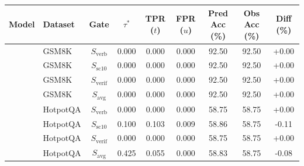 \begin{tabular}{llccccccc}
\toprule
Model & Dataset & Gate & $\tau^*$ & TPR ($t$) & FPR ($u$) & Pred Acc (\%) & Obs Acc (\%) & Diff (\%) \\
\midrule
\modelA{} & GSM8K & $S_{\text{verb}}$ & 0.000 & 0.000 & 0.000 & 92.50 & 92.50 & +0.00 \\
\modelA{} & GSM8K & $S_{\text{sc10}}$ & 0.000 & 0.000 & 0.000 & 92.50 & 92.50 & +0.00 \\
\modelA{} & GSM8K & $S_{\text{verif}}$ & 0.000 & 0.000 & 0.000 & 92.50 & 92.50 & +0.00 \\
\modelA{} & GSM8K & $S_{\text{avg}}$ & 0.000 & 0.000 & 0.000 & 92.50 & 92.50 & +0.00 \\
\modelA{} & HotpotQA & $S_{\text{verb}}$ & 0.000 & 0.000 & 0.000 & 58.75 & 58.75 & +0.00 \\
\modelA{} & HotpotQA & $S_{\text{sc10}}$ & 0.100 & 0.103 & 0.009 & 58.86 & 58.75 & -0.11 \\
\modelA{} & HotpotQA & $S_{\text{verif}}$ & 0.000 & 0.000 & 0.000 & 58.75 & 58.75 & +0.00 \\
\modelA{} & HotpotQA & $S_{\text{avg}}$ & 0.425 & 0.055 & 0.000 & 58.83 & 58.75 & -0.08 \\
\bottomrule
\end{tabular}
